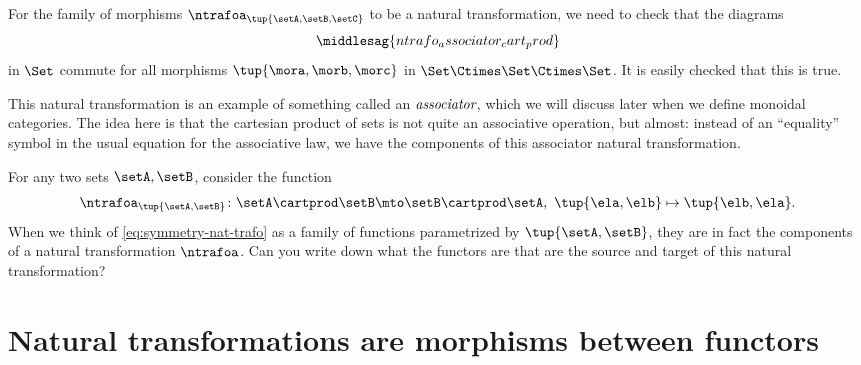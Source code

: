 \begin{example}
    For the family of morphisms $\ntrafoa_{\tup{\setA, \setB, \setC}}$ to be a natural transformation, we need to check that the diagrams
    \begin{equation}
        \label{eq:ntrafo_associator_cart_prod}
        \middlesag{ntrafo_associator_cart_prod}
    \end{equation}
    in $\Set$ commute for all morphisms $\tup{\mora, \morb, \morc}$ in $\Set \Ctimes \Set \Ctimes \Set$.
    It is easily checked that this is true.

    This natural transformation is an example of something called an $\emph{associator}$, which we will discuss later when we define monoidal categories.
    The idea here is that the cartesian product of sets is not quite an associative operation, but almost: instead of an ``equality'' symbol in the usual equation for the associative law, we have the components of this associator natural transformation.
\end{example}

\begin{example}
    For any two sets $\setA, \setB$, consider the function
    \begin{equation}\label{eq:symmetry-nat-trafo}
        \ntrafoa_{\tup{\setA, \setB}} \colon \setA \cartprod \setB \mto \setB \cartprod \setA, \ \tup{\ela, \elb} \mapsto \tup{\elb, \ela}.
    \end{equation}
    When we think of \cref{eq:symmetry-nat-trafo} as a family of functions parametrized by $\tup{\setA, \setB}$, they are in fact the components of a natural transformation $\ntrafoa$.
    Can you write down what the functors are that are the source and target of this natural transformation?
\end{example}

\section{Natural transformations are morphisms between functors}

